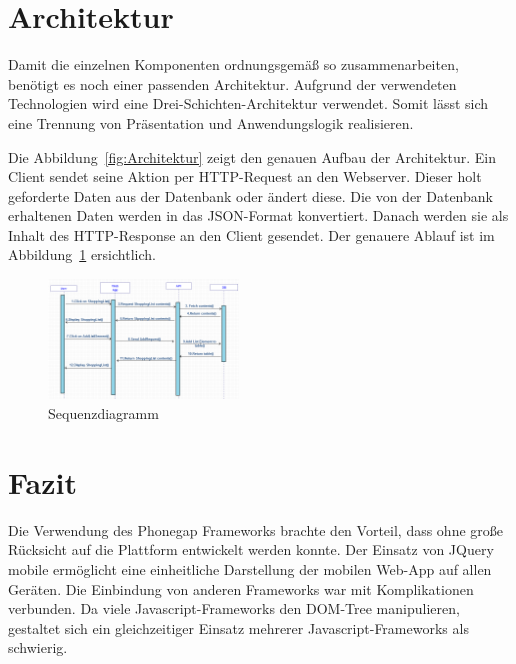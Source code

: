 \documentclass[10pt, conference, compsocconf]{IEEEtran}
\begin{document}
\section{Architektur}
{Damit die einzelnen Komponenten ordnungsgem\"a{\ss} so zusammenarbeiten, ben\"otigt es noch einer passenden Architektur. Aufgrund der verwendeten Technologien wird eine Drei-Schichten-Architektur verwendet. Somit l\"asst sich eine Trennung von Pr\"asentation und Anwendungslogik realisieren.
	
Die Abbildung~\ref{fig:Architektur} zeigt den genauen Aufbau der Architektur. Ein Client sendet seine Aktion per HTTP-Request an den Webserver. Dieser holt geforderte Daten aus der Datenbank oder \"andert diese. Die von der Datenbank erhaltenen Daten werden in das JSON-Format konvertiert. Danach werden sie als Inhalt des HTTP-Response an den Client gesendet. Der genauere Ablauf ist im Abbildung~\ref{fig:Sequenzdiagramm} ersichtlich.

\begin{figure}[h!]
	\centering
	\includegraphics[width=0.45\textwidth]{./Bilder_Zeichnungen/Sequenzdiagramm.png}
	\caption{Sequenzdiagramm}
	\label{fig:Sequenzdiagramm}
\end{figure}

\section{Fazit}
Die Verwendung des Phonegap Frameworks brachte den Vorteil, dass ohne gro{\ss}e R\"ucksicht auf die Plattform entwickelt werden konnte. 
Der Einsatz von JQuery mobile erm\"oglicht eine einheitliche Darstellung der mobilen Web-App auf allen Ger\"aten.
Die Einbindung von anderen Frameworks war mit Komplikationen verbunden.
Da viele Javascript-Frameworks den DOM-Tree manipulieren, gestaltet sich ein gleichzeitiger Einsatz mehrerer Javascript-Frameworks als schwierig.


}
\end{document}

